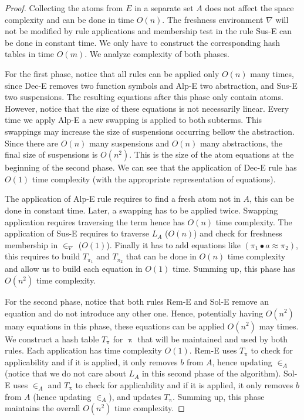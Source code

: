 \documentclass{llncs}
\newcommand{\permef}{\bullet}
\newcommand\ppi{\uppi}
\begin{document}
\begin{proof}
Collecting the atoms from $E$ in a separate set $A$ does not affect the space complexity and can be done in time $O(n)$. The freshness environment $\nabla$ will not be modified by rule applications and membership test in the rule {\sf Sus-E} can be done in constant time.
We only have to construct the corresponding hash tables in time $O(m)$.
We analyze complexity of both phases. 

For the first phase, notice that all rules can be applied only $O(n)$
many times, since {\sf Dec-E} removes two function symbols and {\sf
  Alp-E} two abstraction, and {\sf Sus-E} two suspensions. The
resulting equations after this phase only contain atoms. However,
notice that the size of these equations is not necessarily linear.
Every time we apply {\sf Alp-E} a new swapping is applied to both
subterms.  This swappings may increase the size of suspensions
occurring bellow the abstraction. Since there are $O(n)$ many
suspensions and $O(n)$ many abstractions, the final size of
suspensions is $O(n^2)$. This is the size of the atom equations at the
beginning of the second phase. We can see that the application of
{\sf Dec-E} rule has $O(1)$ time complexity (with the appropriate
representation of equations). 

The application of {\sf Alp-E} rule requires to find a fresh atom not in $A$, this can be done in constant time. Later, a swapping 
has to be applied twice.
Swapping application requires traversing the term hence has $O(n)$
time complexity. The application of {\sf Sus-E} requires to traverse
$L_A$ ($O(n)$) and check for freshness membership in $\in_\nabla$
($O(1)$). Finally it has to add equations like $(\pi_1\permef a\approx
\pi_2)$, this requires to build $T_{\pi_1}$ and $T_{\pi_2}$ that can
be done in $O(n)$ time complexity and allow us to build each equation
in $O(1)$ time.
Summing up, this phase has $O(n^2)$ time complexity.



For the second phase, notice that both rules {\sf Rem-E} and {\sf
  Sol-E} remove an equation and do not introduce any other one. Hence,
potentially having $O(n^2)$ many equations in this phase, these
equations can be applied $O(n^2)$ may times.  We construct a hash
table $T_\ppi$ for $\ppi$ that will be maintained and used by both
rules. Each application has time complexity $O(1)$.
{\sf Rem-E} uses $T_\ppi$ to check for applicability and if it is
applied, it only removes $b$ from $A$, hence updating $\in_A$ (notice that
we do not care about $L_A$ in this second phase of the algorithm).
{\sf Sol-E} uses $\in_A$ and $T_\ppi$ to check for applicability 
and if it is applied, it only removes $b$ from $A$ (hence updating
$\in_A$), and updates $T_\ppi$.
Summing up, this phase maintains the overall $O(n^2)$ time complexity.%
\end{proof}
\end{document}
